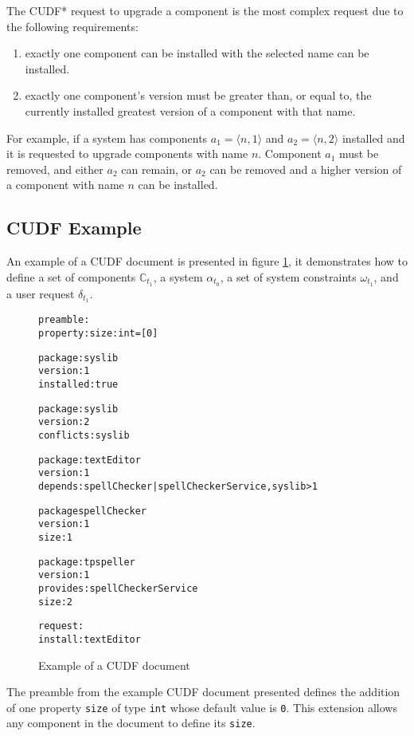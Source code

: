 The CUDF* request to upgrade a component is the most complex request due to the following requirements:
\begin{enumerate}
  \item exactly one component can be installed with  the selected name can be installed.
  \item exactly one component's version must be greater than, or equal to, the currently installed greatest version of a component with that name.
\end{enumerate}
For example, if a system has components $a_1 = \langle n,1 \rangle$ and $a_2 = \langle n,2 \rangle$ installed and it is requested to upgrade components with name $n$.
Component $a_1$ must be removed, and either $a_2$ can remain, or $a_2$ can be removed and a higher version of a component with name $n$ can be installed.

\subsection{CUDF Example}
\label{formal.example}
An example of a CUDF document is presented in figure \ref{formal.CUDFEXAMPLE},
it demonstrates how to define a set of components $\mathbb{C}_{t_1}$, a system $\alpha_{t_{0}}$, 
a set of system constraints $\omega_{t_1}$, 
and a user request $\delta_{t_1}$.

\begin{figure}[ht] 
\begin{center}
\begin{alltt}
preamble:
property: size: int = [0]

package: syslib
version: 1
installed: true

package: syslib
version: 2
conflicts: syslib

package: textEditor
version: 1
depends: spellChecker | spellCheckerService, syslib > 1

package spellChecker
version: 1
size: 1

package: tpspeller
version: 1
provides: spellCheckerService
size: 2

request:
install:textEditor
\end{alltt}
  \caption{Example of a CUDF document}
  \label{formal.CUDFEXAMPLE}
\end{center}
\end{figure} 



The preamble from the example CUDF document presented defines the addition of one property \verb+size+ of type \verb+int+ whose default value is \verb+0+.
This extension allows any component in the document to define its \texttt{size}.

